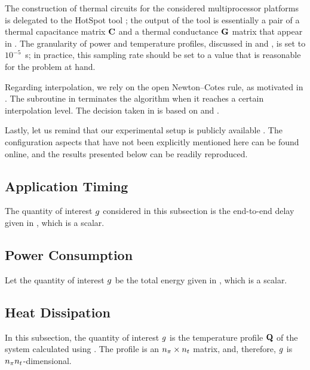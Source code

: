 The construction of thermal  circuits for the considered multiprocessor
platforms is delegated to the HotSpot tool \cite{skadron2004}; the output of the
tool is essentially a pair of a thermal capacitance matrix $\mathbf{C}$ and a thermal
conductance $\mathbf{G}$ matrix that appear in . The granularity
of power and temperature profiles, discussed in  and
, is set to $10^{-5}$~s; in practice, this sampling rate
should be set to a value that is reasonable for the problem at hand.

Regarding interpolation, we rely on the open Newton--Cotes rule, as motivated in
. The  subroutine in
 terminates the algorithm when it reaches a certain
interpolation level. The decision taken in  is based on
 and .

Lastly, let us remind that our experimental setup is publicly available
\cite{sources}. The configuration aspects that have not been explicitly
mentioned here can be found online, and the results presented below can be
readily reproduced.

\subsection{Application Timing}

The quantity of interest $g$ considered in this subsection is the end-to-end
delay given in , which is a scalar.

\subsection{Power Consumption}

Let the quantity of interest $g$ be the total energy given in
, which is a scalar.

\subsection{Heat Dissipation}

In this subsection, the quantity of interest $g$ is the temperature profile
$\mathbf{Q}$ of the system calculated using . The profile is an
${n_\pi} \times {n_t}$ matrix, and, therefore, $g$ is ${n_\pi} {n_t}$-dimensional.
